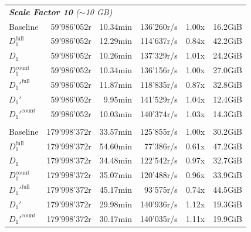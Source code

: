 \begin{longtable}{lrrrrr}
    \multicolumn{6}{l}{\textit{\textbf{Scale Factor 10} ($\sim$10 GB)}} \\
    \nopagebreak
    Baseline              &  59'986'052r          &  10.34min            &  136'260r/s          & 1.00x             & 16.2GiB   \\
    $D_1^{\text{full}}$   &  59'986'052r          &  12.29min            &  114'637r/s          & 0.84x             & 42.2GiB   \\
    \quad $D_1$           &  59'986'052r          &  10.26min            &  137'329r/s          & 1.01x             & 24.2GiB   \\
    $D_1^{\text{count}}$  &  59'986'052r          &  10.34min            &  136'156r/s          & 1.00x             & 27.0GiB   \\
    $D_1'^{\text{full}}$  &  59'986'052r          &  11.87min            &  118'835r/s          & 0.87x             & 32.8GiB   \\
    \quad $D_1'$          &  59'986'052r          &  9.95min             &  141'529r/s          & 1.04x             & 12.4GiB   \\
    $D_1'^{\text{count}}$ &  59'986'052r          &  10.03min            &  140'374r/s          & 1.03x             & 14.3GiB   \\
    \addlinespace

    \multicolumn{6}{l}{\textit{\textbf{Scale Factor 30} ($\sim$30 GB)}} \\
    \nopagebreak
    Baseline              &  179'998'372r         &  33.57min            &  125'855r/s          & 1.00x             & 30.2GiB   \\
    $D_1^{\text{full}}$   &  179'998'372r         &  54.60min            &  77'386r/s           & 0.61x             & 47.2GiB   \\
    \quad $D_1$           &  179'998'372r         &  34.48min            &  122'542r/s          & 0.97x             & 32.7GiB   \\
    $D_1^{\text{count}}$  &  179'998'372r         &  35.07min            &  120'488r/s          & 0.96x             & 33.9GiB   \\
    $D_1'^{\text{full}}$  &  179'998'372r         &  45.17min            &  93'575r/s           & 0.74x             & 44.5GiB   \\
    \quad $D_1'$          &  179'998'372r         &  29.98min            &  140'936r/s          & 1.12x             & 19.3GiB   \\
    $D_1'^{\text{count}}$ &  179'998'372r         &  30.17min            &  140'035r/s          & 1.11x             & 19.9GiB   \\
    \midrule


\end{longtable}
